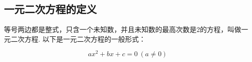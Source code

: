 \documentclass[lang=cn, 10pt, titlestyle=display, oneside, toc=twocol]{elegantbook}
\begin{document}
\subsection{一元二次方程的定义}


\begin{definition}[一元二次方程的定义]
  
等号两边都是整式，只含一个未知数，并且未知数的最高次数是2的方程，叫做一元二次方程. 以下是一元二次方程的一般形式：

\begin{equation}
    ax^2 + bx + c = 0 \ (a \neq 0)
    \label{general_formula}
\end{equation}

 
\end{definition}
\end{document}
